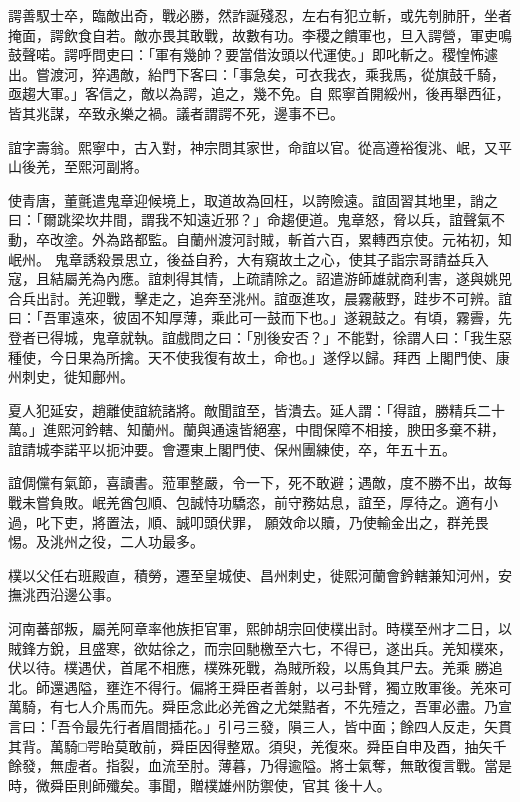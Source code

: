 \begin{pinyinscope}
 諤善馭士卒，臨敵出奇，戰必勝，然詐誕殘忍，左右有犯立斬，或先刳肺肝，坐者掩面，諤飲食自若。敵亦畏其敢戰，故數有功。李稷之饋軍也，旦入諤營，軍吏鳴鼓聲喏。諤呼問吏曰：「軍有幾帥？要當借汝頭以代運使。」即叱斬之。稷惶怖遽出。嘗渡河，猝遇敵，紿門下客曰：「事急矣，可衣我衣，乘我馬，從旗鼓千騎，亟趨大軍。」客信之，敵以為諤，追之，幾不免。自
 熙寧首開綏州，後再舉西征，皆其兆謀，卒致永樂之禍。議者謂諤不死，邊事不已。



 誼字壽翁。熙寧中，古入對，神宗問其家世，命誼以官。從高遵裕復洮、岷，又平山後羌，至熙河副將。



 使青唐，董氈遣鬼章迎候境上，取道故為回枉，以誇險遠。誼固習其地里，誚之曰：「爾跳梁坎井間，謂我不知遠近邪？」命趨便道。鬼章怒，脅以兵，誼聲氣不動，卒改塗。外為路都監。自蘭州渡河討賊，斬首六百，累轉西京使。元祐初，知岷州。
 鬼章誘殺景思立，後益自矜，大有窺故土之心，使其子詣宗哥請益兵入寇，且結屬羌為內應。誼刺得其情，上疏請除之。詔遣游師雄就商利害，遂與姚兕合兵出討。羌迎戰，擊走之，追奔至洮州。誼亟進攻，晨霧蔽野，跬步不可辨。誼曰：「吾軍遠來，彼固不知厚薄，乘此可一鼓而下也。」遂親鼓之。有頃，霧霽，先登者已得城，鬼章就執。誼戲問之曰：「別後安否？」不能對，徐謂人曰：「我生惡種使，今日果為所擒。天不使我復有故土，命也。」遂俘以歸。拜西
 上閣門使、康州刺史，徙知鄜州。



 夏人犯延安，趙離使誼統諸將。敵聞誼至，皆潰去。延人謂：「得誼，勝精兵二十萬。」進熙河鈐轄、知蘭州。蘭與通遠皆絕塞，中間保障不相接，腴田多棄不耕，誼請城李諾平以扼沖要。會遷東上閣門使、保州團練使，卒，年五十五。



 誼倜儻有氣節，喜讀書。蒞軍整嚴，令一下，死不敢避；遇敵，度不勝不出，故每戰未嘗負敗。岷羌酋包順、包誠恃功驕恣，前守務姑息，誼至，厚待之。適有小過，叱下吏，將置法，順、誠叩頭伏罪，
 願效命以贖，乃使輸金出之，群羌畏惕。及洮州之役，二人功最多。



 樸以父任右班殿直，積勞，遷至皇城使、昌州刺史，徙熙河蘭會鈐轄兼知河州，安撫洮西沿邊公事。



 河南蕃部叛，屬羌阿章率他族拒官軍，熙帥胡宗回使樸出討。時樸至州才二日，以賊鋒方銳，且盛寒，欲姑徐之，而宗回馳檄至六七，不得已，遂出兵。羌知樸來，伏以待。樸遇伏，首尾不相應，樸殊死戰，為賊所殺，以馬負其尸去。羌乘
 勝追北。師還遇隘，壅迮不得行。偏將王舜臣者善射，以弓卦臂，獨立敗軍後。羌來可萬騎，有七人介馬而先。舜臣念此必羌酋之尤桀黠者，不先殪之，吾軍必盡。乃宣言曰：「吾令最先行者眉間插花。」引弓三發，隕三人，皆中面；餘四人反走，矢貫其背。萬騎□咢眙莫敢前，舜臣因得整眾。須臾，羌復來。舜臣自申及酉，抽矢千餘發，無虛者。指裂，血流至肘。薄暮，乃得逾隘。將士氣奪，無敢復言戰。當是時，微舜臣則師殲矣。事聞，贈樸雄州防禦使，官其
 後十人。




\end{pinyinscope}
